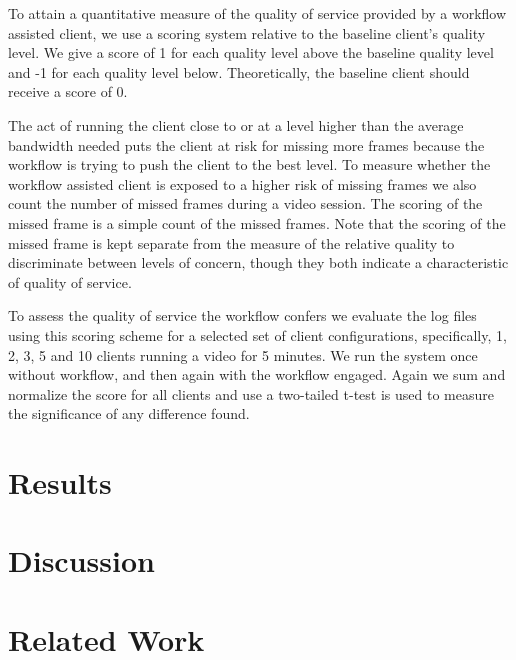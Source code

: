 \documentclass{sig-alternate}
\begin{document}
To attain a quantitative measure of the quality of service provided by
a workflow assisted client, we use a scoring system relative to the
baseline client's quality level.  We give a score of 1 for each
quality level above the baseline quality level and -1 for each quality
level below.  Theoretically, the baseline client should receive a
score of 0.


The act of running the client close to or at a level higher than the
average bandwidth needed puts the client at risk for missing more
frames because the workflow is trying to push the client to the best
level.  To measure whether the workflow assisted client is exposed to
a higher risk of missing frames we also count the number of missed
frames during a video session.  The scoring of the missed frame is a
simple count of the missed frames.  Note that the scoring of the
missed frame is kept separate from the measure of the relative quality
to discriminate between levels of concern, though they both indicate a
characteristic of quality of service.

To assess the quality of service the workflow confers we evaluate the
log files using this scoring scheme for a selected set of client
configurations, specifically, 1, 2, 3, 5 and 10 clients running a
video for 5 minutes.  We run the system once without workflow, and
then again with the workflow engaged.  Again we sum and normalize the
score for all clients and use a two-tailed t-test is used to measure
the significance of any difference found.


\section{Results} \label{results}

\section{Discussion} \label{discussion}

\section{Related Work} \label{related}
\end{document}
